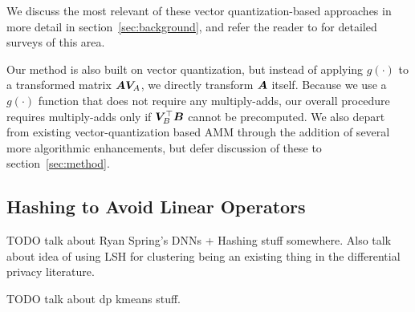 We discuss the most relevant of these vector quantization-based approaches in more detail in section~\ref{sec:background}, and refer the reader to \cite{learningToHashSurvey, hashingSimilaritySurvey} for detailed surveys of this area. %

Our method is also built on vector quantization, but instead of applying $g(\cdot)$ to a transformed matrix $\bm{A} \bm{V}_A$, we directly transform $\bm{A}$ itself. Because we use a $g(\cdot)$ function that does not require any multiply-adds, our overall procedure requires multiply-adds only if $\bm{V}_B^\top \bm{B}$ cannot be precomputed. We also depart from existing vector-quantization based AMM through the addition of several more algorithmic enhancements, but defer discussion of these to section~\ref{sec:method}.


\subsection{Hashing to Avoid Linear Operators}

TODO talk about Ryan Spring's DNNs + Hashing stuff somewhere. Also talk about idea of using LSH for clustering being an existing thing in the differential privacy literature.

TODO talk about dp kmeans stuff.




